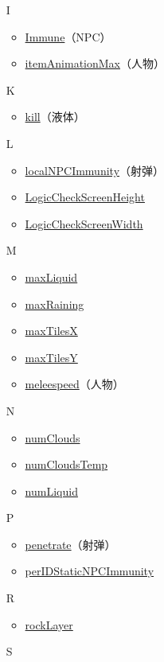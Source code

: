 \begin{multicols}{2}[]
{\begin{itemize}
\item[I] \begin{itemize}
	\item \hyperref[sec24]{Immune}（NPC）
	\item \hyperref[sec28]{itemAnimationMax}（人物）
	\end{itemize}
\item[K] \begin{itemize}
	\item \hyperref[tab10]{kill}（液体）
	\end{itemize}
\item[L] \begin{itemize}
	\item \hyperref[sec26]{localNPCImmunity}（射弹）
	\item \hyperref[tab9]{LogicCheckScreenHeight}
	\item \hyperref[tab9]{LogicCheckScreenWidth}
	\end{itemize}
\item[M] \begin{itemize}
	\item \hyperref[tab10]{maxLiquid}
	\item \href{https://www.bbstr.net/threads/133/#post-623}{maxRaining}
	\item \hyperref[tab8]{maxTilesX}
	\item \hyperref[tab8]{maxTilesY}
	\item \hyperref[sec28]{meleespeed}（人物）
	\end{itemize}
\item[N] \begin{itemize}
	\item \href{https://www.bbstr.net/threads/133/#post-623}{numClouds}
	\item \href{https://www.bbstr.net/threads/133/#post-623}{numCloudsTemp}
	\item \hyperref[tab10]{numLiquid}
	\end{itemize}
\item[P] \begin{itemize}
	\item \hyperref[sec25]{penetrate}（射弹）
	\item \hyperref[sec27]{perIDStaticNPCImmunity}
	\end{itemize}
\item[R] \begin{itemize}
	\item \hyperref[tab8]{rockLayer}
	\end{itemize}
\item[S] \begin{itemize}

\end{itemize}
\end{itemize}}
\end{multicols}
